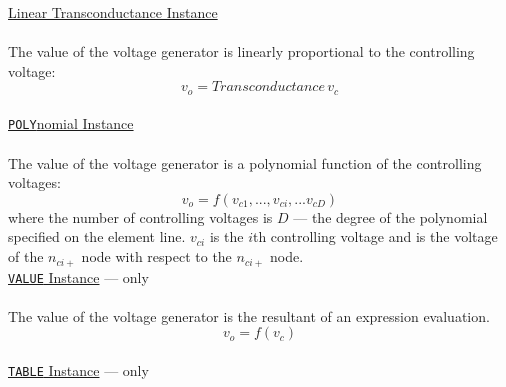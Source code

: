 
\noindent\underline{Linear Transconductance Instance}
\\[0.1in]\hspace*{\fill}\\[0.1in]
The value of the voltage generator is linearly proportional to the controlling
voltage:
\begin{equation}
v_o = Transconductance\,v_c
\end{equation}
\\[0.2in]\noindent\underline{{\tt POLY}nomial Instance}
\\[0.1in]\hspace*{\fill}\\[0.1in]
The value of the voltage generator is a polynomial function of the controlling
voltages:
\begin{equation}
v_o = f(v_{c1}, ...,  v_{ci}, ...  v_{cD})
\end{equation}
where the number of controlling voltages is $D$ --- the degree of the polynomial
specified on the element line.
$v_{ci}$ is the $i$th controlling voltage and is the voltage of the
$n_{ci+}$ node with respect to the $n_{ci+}$ node.
\\[0.2in]\noindent\underline{{\tt VALUE} Instance} ---  only
\\[0.1in]\hspace*{\fill}\\[0.1in]
The value of the voltage generator is the resultant of an expression evaluation.
\begin{equation}
v_o = f(v_c)
\end{equation}
\\[0.2in]\noindent\underline{{\tt TABLE} Instance} ---  only
\\[0.1in]\hspace*{\fill}\\[0.1in]
